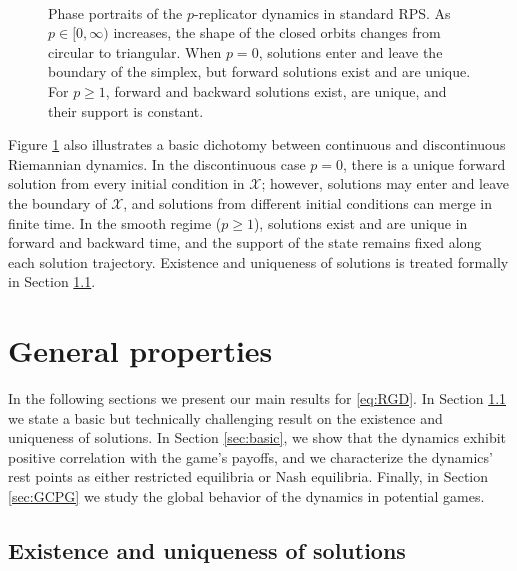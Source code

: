 \documentclass[reqno]{amsart}
\theoremstyle{plain}
\theoremstyle{definition}
\theoremstyle{remark}
\numberwithin{equation}{section}
\numberwithin{theorem}{section}
\begin{document}
\begin{figure}[t]
\centering
{} 
\hfill
{}
\\
\hfill
{}\caption{\small
Phase portraits of the $p$-replicator dynamics in standard \acl{RPS}.
As $p \in [0, \infty)$ increases, the shape of the closed orbits changes from circular to triangular.
When $p = 0$, solutions enter and leave the boundary of the simplex, but forward solutions exist and are unique.
For $p \geq 1$, forward and backward solutions exist, are unique, and their support is constant.
}
\label{fig:portraits}
\end{figure}

Figure \ref{fig:portraits} also illustrates a basic dichotomy between continuous and discontinuous Riemannian dynamics.
In the discontinuous case $p=0$, there is a unique forward solution from every initial condition in ${\mathcal{X}}$;
however, solutions may enter and leave the boundary of ${\mathcal{X}}$, and solutions from different initial conditions can merge in finite time.
In the smooth regime ($p\geq1$), solutions exist and are unique in forward and backward time, and the support of the state remains fixed along each solution trajectory.
Existence and uniqueness of solutions is treated formally in Section \ref{sec:wp}.

\section{General properties}
\label{sec:analysis}

In the following sections we present our main results for \eqref{eq:RGD}.
In Section \ref{sec:wp} we state a basic but technically challenging result on the existence and uniqueness of solutions.
In Section \ref{sec:basic}, we show that the dynamics exhibit positive correlation with the game's payoffs, and we characterize the dynamics' rest points as either restricted equilibria or Nash equilibria.
Finally, in Section \ref{sec:GCPG} we study the global behavior of the dynamics in potential games.

\subsection{Existence and uniqueness of solutions}
\label{sec:wp}
\end{document}
